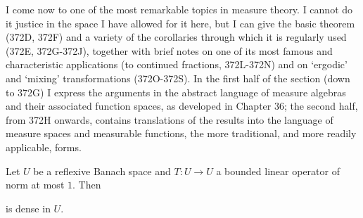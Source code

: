 
\def\chaptername{Linear operators between function spaces}
\def\sectionname{The ergodic theorem}


I come now to one of the most remarkable topics in measure theory.   I
cannot do it justice in the space I have allowed for it here, but I can
give the basic theorem (372D, 372F) and a variety of the corollaries
through which it is regularly used (372E,
372G-372J), %
together with brief
notes on one of its most famous and characteristic applications (to
continued fractions, 372L-372N) %
and on `ergodic' and `mixing'
transformations (372O-372S). %
In the first half of the section (down to
372G) I express the arguments in the abstract language of measure
algebras and their associated function spaces, as developed in Chapter
36;  the second half, from 372H onwards,
contains translations of the
results into the language of measure spaces and measurable functions,
the more traditional, and more readily applicable, forms.

 Let $U$ be a reflexive Banach space and $T:U\to U$
a bounded linear operator of norm at most $1$.   Then


\noindent is dense in $U$.

